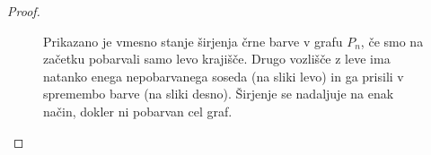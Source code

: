 \documentclass[12pt,a4paper,twoside]{article}
\theoremstyle{definition} %
\theoremstyle{plain} %
\numberwithin{equation}{section}  %
\begin{document}
\begin{proof}
\begin{figure}[h]
\begin{subfigure}{0.49\textwidth}
        \end{subfigure}
        \caption{Prikazano je vmesno stanje širjenja črne barve v grafu $P_n$, če smo na začetku pobarvali samo levo krajišče. Drugo vozlišče z leve ima natanko enega nepobarvanega soseda (na sliki levo) in ga prisili v spremembo barve (na sliki desno). Širjenje se nadaljuje na enak način, dokler ni pobarvan cel graf.}
        \label{fig:pot}
    \end{figure}
\end{proof}
\end{document}
